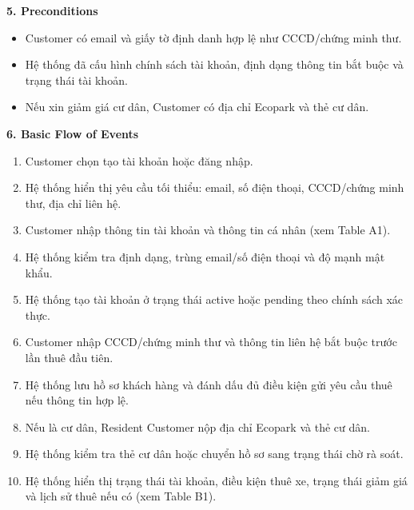 \textbf{5. Preconditions}
\begin{itemize}
  \item Customer có email và giấy tờ định danh hợp lệ như CCCD/chứng minh thư.
  \item Hệ thống đã cấu hình chính sách tài khoản, định dạng thông tin bắt buộc và trạng thái tài khoản.
  \item Nếu xin giảm giá cư dân, Customer có địa chỉ Ecopark và thẻ cư dân.
\end{itemize}

\textbf{6. Basic Flow of Events}
\begin{enumerate}
  \item Customer chọn tạo tài khoản hoặc đăng nhập.
  \item Hệ thống hiển thị yêu cầu tối thiểu: email, số điện thoại, CCCD/chứng minh thư, địa chỉ liên hệ.
  \item Customer nhập thông tin tài khoản và thông tin cá nhân (xem Table A1).
  \item Hệ thống kiểm tra định dạng, trùng email/số điện thoại và độ mạnh mật khẩu.
  \item Hệ thống tạo tài khoản ở trạng thái active hoặc pending theo chính sách xác thực.
  \item Customer nhập CCCD/chứng minh thư và thông tin liên hệ bắt buộc trước lần thuê đầu tiên.
  \item Hệ thống lưu hồ sơ khách hàng và đánh dấu đủ điều kiện gửi yêu cầu thuê nếu thông tin hợp lệ.
  \item Nếu là cư dân, Resident Customer nộp địa chỉ Ecopark và thẻ cư dân.
  \item Hệ thống kiểm tra thẻ cư dân hoặc chuyển hồ sơ sang trạng thái chờ rà soát.
  \item Hệ thống hiển thị trạng thái tài khoản, điều kiện thuê xe, trạng thái giảm giá và lịch sử thuê nếu có (xem Table B1).
\end{enumerate}

